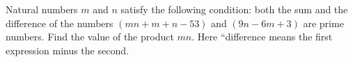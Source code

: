 Natural numbers $m$ and $n$ satisfy the following condition: both the sum and the difference of the numbers $(mn+m+n-53)$ and $(9n-6m+3)$ are prime numbers. Find the value of the product $mn$.  Here ``difference means the first expression minus the second.

